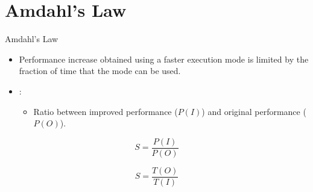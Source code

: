 \section{Amdahl's Law}

\begin{frame}[t]{Amdahl's Law}
\begin{itemize}
  \item Performance increase obtained using a faster execution mode
        is limited by the fraction of time that the mode can be used.

  \item {}:
    \begin{itemize}
      \item Ratio between improved performance ($P(I)$) and original performance ($P(O)$).
    \end{itemize}
\end{itemize}

\begin{displaymath}
S = \frac{P(I)}{P(O)}
\end{displaymath}

\begin{displaymath}
S = \frac{T(O)}{T(I)}
\end{displaymath}
\end{frame}


